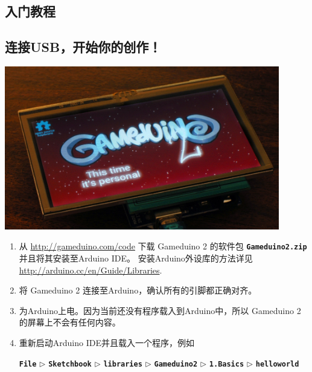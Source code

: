 \documentclass[10pt]{book}
\newcommand{\gdtwo}{Gameduino 2 }
\newcommand{\mach}[1]{\texttt{\textbf{#1}}}
\begin{document}
\begin{CJK}{UTF8}{gkai}
\vfill


\endgroup

\thispagestyle{empty}
\pagestyle{headings}

\tableofcontents

\part{入门教程}

\chapter{连接USB，开始你的创作！}

\begin{center}
\includegraphics[width=0.9\textwidth]{assets/plugin.jpg}
\end{center}

\begin{enumerate}

\item
从 \url{http://gameduino.com/code} 下载 \gdtwo 的软件包 \mach{Gameduino2.zip} 并且将其安装至Arduino IDE。
安装Arduino外设库的方法详见
\url{http://arduino.cc/en/Guide/Libraries}.

\item
将 \gdtwo 连接至Arduino，确认所有的引脚都正确对齐。

\item
为Arduino上电。因为当前还没有程序载入到Arduino中，所以 \gdtwo 的屏幕上不会有任何内容。

\item
重新启动Arduino IDE并且载入一个程序，例如 \\
\begin{small}
\mach{File} $\triangleright$
\mach{Sketchbook} $\triangleright$
\mach{libraries} $\triangleright$
\mach{Gameduino2} $\triangleright$
\mach{1.Basics} $\triangleright$
\mach{helloworld}
\end{small}


\end{enumerate}
\end{CJK}
\end{document}

